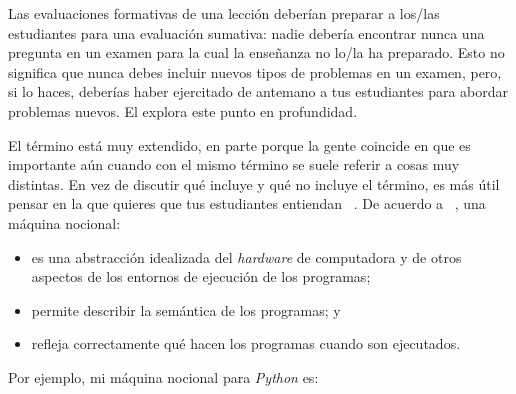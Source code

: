 Las evaluaciones formativas de una lección deberían preparar a los/las estudiantes para una evaluación sumativa:
nadie debería encontrar nunca una pregunta en un examen para la cual la enseñanza no lo/la ha preparado.
Esto no significa que nunca debes incluir nuevos tipos de problemas en un examen, pero, si lo haces,
deberías haber ejercitado de antemano a tus estudiantes para abordar problemas nuevos. 
El  explora este punto en profundidad.


El término  está muy extendido,
en parte porque la gente coincide en que es importante aún cuando con el mismo término se suele referir a cosas muy distintas.
En vez de discutir qué incluye y qué no incluye el término,
es más útil pensar en la 
que quieres que tus estudiantes entiendan ~\cite{DuBo1986}.
De acuerdo a ~\cite{Sorv2013},
una máquina nocional:

\begin{itemize}

\item
es una abstracción idealizada del \emph{hardware} de computadora  
y de otros aspectos de los entornos de ejecución de los programas;

\item
  permite describir la semántica de los programas;
  y

\item
  refleja correctamente qué hacen los programas cuando son ejecutados.

\end{itemize}

\noindent
Por ejemplo, mi máquina nocional para \emph{Python} es:

